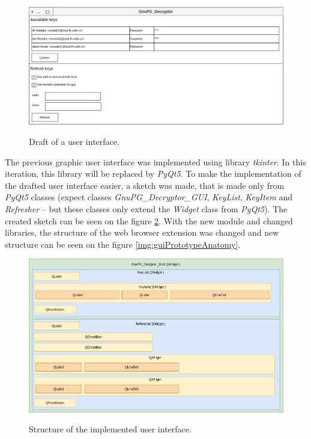 \begin{figure}[H]
    \begin{center}
        \label{img:userInterfaceDesign}
        \includegraphics[width=1.0\textwidth]{obrazky-figures/UI-design.png}
        \caption{Draft of a user interface.}
    \end{center}
\end{figure}

The previous graphic user interface was implemented using library \textit{tkinter}. In this iteration, this library will be replaced by \textit{PyQt5}. To make the implementation of the drafted user interface easier, a sketch was made, that is made only from \textit{PyQt5} classes (expect classes \textit{GnuPG\_Decryptor\_GUI}, \textit{KeyList}, \textit{KeyItem} and \textit{Refresher} -- but these classes only extend the \textit{Widget} class from \textit{PyQt5}). The created sketch can be seen on the figure \ref{img:userInterfaceImplementation}. With the new module and changed libraries, the structure of the web browser extension was changed and new structure can be seen on the figure \ref{img:guiPrototypeAnatomy}.

\begin{figure}[]
    \begin{center}
        \label{img:userInterfaceImplementation}
        \includegraphics[width=1.0\textwidth]{obrazky-figures/UI-implemented.png}
        \caption{Structure of the implemented user interface.}
    \end{center}
\end{figure}

